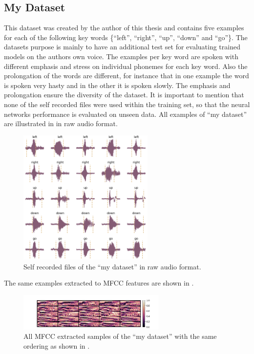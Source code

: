\FloatBarrier
\noindent



\subsection{My Dataset}\label{sec:exp_dataset_my}
This dataset was created by the author of this thesis and contains five examples for each of the following key words \{\enquote{left}, \enquote{right}, \enquote{up}, \enquote{down} and \enquote{go}\}.
The datasets purpose is mainly to have an additional test set for evaluating trained models on the authors own voice.
The examples per key word are spoken with different emphasis and stress on individual phonemes for each key word.
Also the prolongation of the words are different, for instance that in one example the word is spoken very hasty and in the other it is spoken slowly.
The emphasis and prolongation ensure the diversity of the dataset.
It is important to mention that none of the self recorded files were used within the training set, so that the neural networks performance is evaluated on unseen data.
All examples of \enquote{my dataset} are illustrated in  in raw audio format.
\begin{figure}[!ht]
  \centering
    \includegraphics[width=0.6\textwidth]{./5_exp/figs/exp_dataset_my_wav_grid.png}
  \caption{Self recorded files of the \enquote{my dataset} in raw audio format.}
  \label{fig:exp_dataset_my_wav_grid}
\end{figure}
\FloatBarrier
\noindent
The same examples extracted to MFCC features are shown in .
\begin{figure}[!ht]
  \centering
    \includegraphics[width=0.65\textwidth]{./5_exp/figs/exp_dataset_my_mfcc.png}
  \caption{All MFCC extracted samples of the \enquote{my dataset} with the same ordering as shown in .}
  \label{fig:exp_dataset_my_mfcc}
\end{figure}
